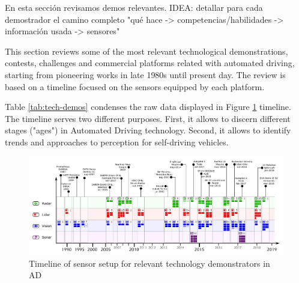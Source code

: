 
En esta sección revisamos demos relevantes.
IDEA: detallar para cada demostrador el camino completo "qué hace -> competencias/habilidades -> información usada -> sensores"

This section reviews some of the most relevant technological demonstrations,
contests, challenges and commercial platforms related with automated driving, 
starting from pioneering works in late 1980s until present day. The review is
based on a timeline focused on the sensors equipped by each platform.

Table \ref{tab:tech-demos} condenses the raw data displayed in Figure 
\ref{fig:tech-demos} timeline. The timeline serves two different purposes. 
First, it allows to discern different stages ("ages") in Automated Driving 
technology. Second, it allows to identify trends and approaches to perception 
for self-driving vehicles.



\begin{figure}[h]
\centering
\includegraphics[width=0.95\textheight,angle=90,keepaspectratio]{"img/AD_Timeline_2"}
\caption{Timeline of sensor setup for relevant technology demonstrators in AD}
\label{fig:tech-demos}
\end{figure}

